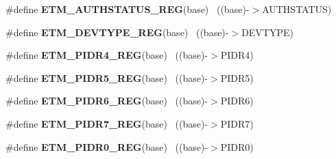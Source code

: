 \begin{DoxyCompactItemize}
\item 
\hypertarget{group___e_t_m___register___accessor___macros_ga3deff2d9aabe01be17e515265c5b505c}{}\#define {\bfseries E\+T\+M\+\_\+\+A\+U\+T\+H\+S\+T\+A\+T\+U\+S\+\_\+\+R\+E\+G}(base)                              ~((base)-\/$>$A\+U\+T\+H\+S\+T\+A\+T\+U\+S)\label{group___e_t_m___register___accessor___macros_ga3deff2d9aabe01be17e515265c5b505c}

\item 
\hypertarget{group___e_t_m___register___accessor___macros_ga1383add0aed277ca21e88b6daaafaa76}{}\#define {\bfseries E\+T\+M\+\_\+\+D\+E\+V\+T\+Y\+P\+E\+\_\+\+R\+E\+G}(base)                                    ~((base)-\/$>$D\+E\+V\+T\+Y\+P\+E)\label{group___e_t_m___register___accessor___macros_ga1383add0aed277ca21e88b6daaafaa76}

\item 
\hypertarget{group___e_t_m___register___accessor___macros_ga86198fa9aafceb1fd3d95b14408f6298}{}\#define {\bfseries E\+T\+M\+\_\+\+P\+I\+D\+R4\+\_\+\+R\+E\+G}(base)                                        ~((base)-\/$>$P\+I\+D\+R4)\label{group___e_t_m___register___accessor___macros_ga86198fa9aafceb1fd3d95b14408f6298}

\item 
\hypertarget{group___e_t_m___register___accessor___macros_gaca68752a8366e050c469fb3bc3c0b15a}{}\#define {\bfseries E\+T\+M\+\_\+\+P\+I\+D\+R5\+\_\+\+R\+E\+G}(base)                                        ~((base)-\/$>$P\+I\+D\+R5)\label{group___e_t_m___register___accessor___macros_gaca68752a8366e050c469fb3bc3c0b15a}

\item 
\hypertarget{group___e_t_m___register___accessor___macros_ga768d4ba5229d92d1b94e04290f08c7f6}{}\#define {\bfseries E\+T\+M\+\_\+\+P\+I\+D\+R6\+\_\+\+R\+E\+G}(base)                                        ~((base)-\/$>$P\+I\+D\+R6)\label{group___e_t_m___register___accessor___macros_ga768d4ba5229d92d1b94e04290f08c7f6}

\item 
\hypertarget{group___e_t_m___register___accessor___macros_gaf4b55e52716baaf77e46dd60033b7cfd}{}\#define {\bfseries E\+T\+M\+\_\+\+P\+I\+D\+R7\+\_\+\+R\+E\+G}(base)                                        ~((base)-\/$>$P\+I\+D\+R7)\label{group___e_t_m___register___accessor___macros_gaf4b55e52716baaf77e46dd60033b7cfd}

\item 
\hypertarget{group___e_t_m___register___accessor___macros_gaad937146f4e70f50062ad9a50997edba}{}\#define {\bfseries E\+T\+M\+\_\+\+P\+I\+D\+R0\+\_\+\+R\+E\+G}(base)                                        ~((base)-\/$>$P\+I\+D\+R0)\label{group___e_t_m___register___accessor___macros_gaad937146f4e70f50062ad9a50997edba}


\end{DoxyCompactItemize}
